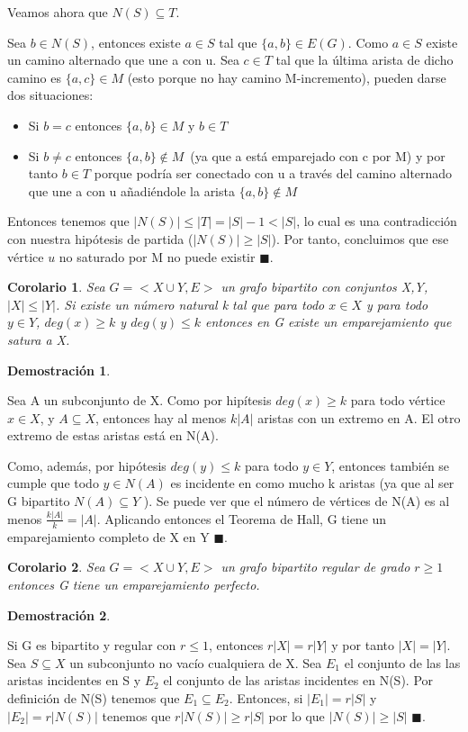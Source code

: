 \documentclass[a4paper,1pt]{report}
\newtheorem*{cor}{Corolario}
\newtheorem*{dem}{Demostración}
\begin{document}
Veamos ahora que $N(S)\subseteq  T$.

Sea $b\in N(S)$, entonces existe $a\in S$ tal que $\{a,b\}\in E(G)$. Como $a\in S$ existe un camino alternado que une a con u. Sea $c\in T$ tal que la última arista de dicho camino es $\{a,c\}\in M$ (esto porque no hay camino M-incremento), pueden darse dos situaciones:
\begin{itemize}
 \item Si $b=c$ entonces $\{a,b\}\in M$ y  $b\in T$
 \item Si $b\neq c$ entonces $\{a,b\}\not \in M$~(ya que a está emparejado con c por M) y por tanto $b\in T$ porque podría ser conectado con u a través del camino alternado que
une a con u añadiéndole la arista $\{a,b\}\not \in M$
\end{itemize}

Entonces tenemos que $|N(S)| \leq |T| = |S| - 1 < |S|$, lo cual es una contradicción con
nuestra hipótesis de partida ($|N(S)| \geq |S|$). Por tanto, concluimos que ese vértice $u$ no
saturado por M no puede existir $\blacksquare$.


\begin{cor}
 Sea $G=<X\cup Y, E>$ un grafo bipartito con conjuntos X,Y, $|X|\leq|Y|$. Si existe un número natural k tal que para todo $x\in X$ y para todo $y\in Y$, $deg(x)\geq k$ y $deg(y)\leq k$ entonces en G existe un emparejamiento que satura a X.
\end{cor}

\newpage

\begin{dem}
 
\end{dem}


Sea A un subconjunto de X. Como por hipítesis $deg(x)\geq k$ para todo vértice
$x \in X$, y $A \subseteq X$, entonces hay al menos $k|A|$ aristas con un extremo en A. 
El otro extremo de estas aristas está en N(A). 

Como, además, por hipótesis $deg(y) \leq k$ para todo $y \in Y $,
entonces también se cumple que todo $y \in N(A)$ es incidente en como mucho k aristas (ya
que al ser G bipartito $N(A) \subseteq Y$ ). Se puede ver que el número de vértices de N(A) es al menos $\frac{k|A|}{k} = |A|$. Aplicando entonces el Teorema de Hall, G tiene un emparejamiento completo de X en Y $\blacksquare$.

\begin{cor}
 Sea $G=<X\cup Y, E>$ un grafo bipartito regular de grado $r\geq 1$  entonces G
tiene un emparejamiento perfecto.
\end{cor}


\begin{dem}
 
\end{dem}


Si G es bipartito y regular con $r\leq 1$, entonces $r|X| = r|Y|$ y por tanto $|X|=|Y|$.
Sea $S \subseteq X$ un subconjunto no vacío cualquiera de X. Sea $E_1$ el conjunto de las
las aristas incidentes en S y $E_2$ el conjunto de las aristas incidentes en N(S). Por definición de N(S) tenemos que $E_1\subseteq E_2$. Entonces, si $|E_1|=r|S|$ y 
$|E_2|=r|N(S)|$ tenemos que $r|N(S)|\geq r|S|$ por lo que $|N(S)|\geq |S|$ $\blacksquare$.
\end{document}
